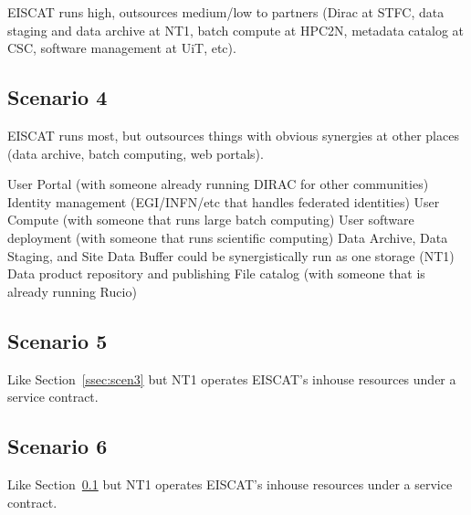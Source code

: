\documentclass[12pt,a4paper]{article}
\begin{document}
EISCAT runs high, outsources medium/low to partners (Dirac at STFC, data staging and data archive at NT1, batch compute at HPC2N, metadata catalog at CSC, software management at UiT, etc).


\subsection{Scenario 4}
\label{ssec:scen4}

EISCAT runs most, but outsources things with obvious synergies at other places (data archive, batch computing, web portals). 

User Portal (with someone already running DIRAC for other communities)
Identity management (EGI/INFN/etc that handles federated identities)
User Compute (with someone that runs large batch computing)
User software deployment (with someone that runs scientific computing)
Data Archive, Data Staging, and Site Data Buffer could be synergistically run as one storage (NT1)
Data product repository and publishing
File catalog (with someone that is already running Rucio)

\subsection{Scenario 5}
\label{ssec:scen5}

Like Section~\ref{ssec:scen3} but NT1 operates EISCAT's inhouse resources under a service contract.

\subsection{Scenario 6}
\label{ssec:scen6}


Like Section~\ref{ssec:scen4} but NT1 operates EISCAT's inhouse resources under a service contract.

\newpage
{}

\end{document}

